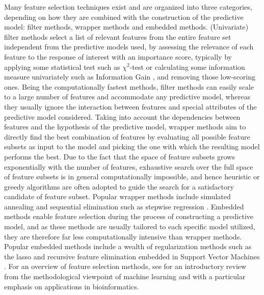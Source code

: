 Many feature selection techniques exist and are organized into three categories, depending on how they are combined with the construction of the predictive model: filter methods, wrapper methods and embedded methods. (Univariate) filter methods select a list of relevant features from the entire feature set independent from the predictive models used, by assessing the relevance of each feature to the response of interest with an importance score, typically by applying some statistical test such as $\chi^2$-test or calculating some information measure univariately such as Information Gain \cite{Xing2001Feature}, and removing those low-scoring ones. Being the computationally fastest methods, filter methods can easily scale to a large number of features and accommodate any predictive model, whereas they usually ignore the interaction between features and special attributes of the predictive model considered. Taking into account the dependencies between features and the hypothesis of the predictive model, wrapper methods aim to directly find the best combination of features by evaluating all possible feature subsets as input to the model and picking the one with which the resulting model performs the best. Due to the fact that the space of feature subsets grows exponentially with the number of features, exhaustive search over the full space of feature subsets is in general computationally impossible, and hence heuristic or greedy algorithms are often adopted to guide the search for a satisfactory candidate of feature subset. Popular wrapper methods include simulated annealing \cite{Kirkpatrick1983Optimization} and sequential elimination such as stepwise regression \cite{Hocking1976analysis}. Embedded methods enable feature selection during the process of constructing a predictive model, and as these methods are usually tailored to each specific model utilized, they are therefore far less computationally intensive than wrapper methods. Popular embedded methods include a wealth of regularization methods such as the lasso \cite{Hastie2009Elements} and recursive feature elimination embedded in Support Vector Machines \cite{Guyon2002Gene}. For an overview of feature selection methods, see \cite{Guyon2003introduction, Li2016Feature} for an introductory review from the methodological viewpoint of machine learning and \cite{Saeys2007review, Hira2015review} with a particular emphasis on applications in bioinformatics.



